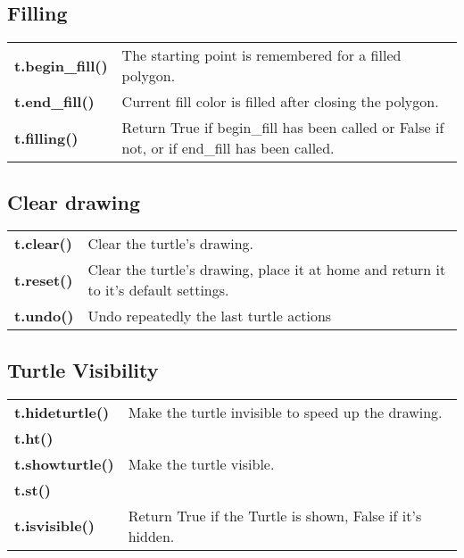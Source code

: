 \documentclass{article}
\begin{document}
\subsection*{Filling}

\begin{tabularx}{\textwidth}{p{}X}
\textbf{t.begin\_fill()} & The starting point is remembered for a filled polygon. \\
\textbf{t.end\_fill()} & Current fill color is filled after closing the polygon. \\
\textbf{t.filling()} & Return True if begin\_fill has been called or False if not, or if end\_fill has been called. \\
\end{tabularx}

\subsection*{Clear drawing}

\begin{tabularx}{\textwidth}{p{}X}
\textbf{t.clear()} & Clear the turtle's drawing. \\
\textbf{t.reset()} & Clear the turtle's drawing, place it at home and return it to it's default settings. \\
\textbf{t.undo()} & Undo repeatedly the last turtle actions \\
\end{tabularx}

\subsection*{Turtle Visibility}

\begin{tabularx}{\textwidth}{p{}X}
\textbf{t.hideturtle()} & Make the turtle invisible to speed up the drawing. \\
\textbf{t.ht()} &  \\
\textbf{t.showturtle()} & Make the turtle visible. \\
\textbf{t.st()} &  \\
\textbf{t.isvisible()} & Return True if the Turtle is shown, False if it's hidden. \\
\end{tabularx}
\end{document}
